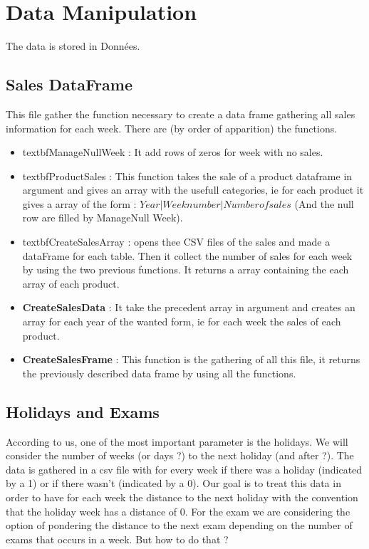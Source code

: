 \documentclass{report}
\begin{document}
\section{Data Manipulation}
The data is stored in Données.\\

\subsection{Sales DataFrame}

This file gather the function necessary to create a data frame gathering all sales information for each week. There are (by order of apparition) the functions.

\begin{itemize}
\item textbf{ManageNullWeek} : It add rows of zeros for week with no sales.
\item textbf{ProductSales} : This function takes the sale of a product dataframe in argument and gives an array with the usefull categories, ie for each product it gives a array of the form : $Year | Week number  | Number of sales$ (And the null row are filled by ManageNull Week).
\item textbf{CreateSalesArray} : opens thee CSV files of the sales and made a dataFrame for each table. Then it collect the number of sales for each week by using the two previous functions. It returns a array containing the each array of each product.
\item \textbf{CreateSalesData} : It take the precedent array in argument and creates an array for each year of the wanted form, ie for each week the sales of each product.
\item \textbf{CreateSalesFrame} : This function is the gathering of all this file, it returns the previously described data frame by using all the functions.
\end{itemize}

\subsection{Holidays and Exams}

According to us, one of the most important parameter is the holidays. We will consider the number of weeks (or days ?) to the next holiday (and after ?). The data is gathered in a csv file with for every week if there was a holiday (indicated by a 1) or if there wasn't (indicated by a 0). Our goal is to treat this data in order to have for each week the distance to the next holiday with the convention that the holiday week has a distance of 0. 
For the exam we are considering the option of pondering the distance to the next exam depending on the number of exams that occurs in a week. But how to do that ?
\end{document}
